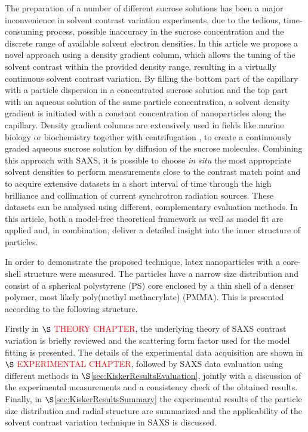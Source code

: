 The preparation of a number of different sucrose solutions has been a major inconvenience in solvent contrast variation experiments, due to the tedious, time-consuming process, possible inaccuracy in the sucrose concentration and the discrete range of available solvent electron densities. In this article we propose a novel approach using a density gradient column, which allows the tuning of the solvent contrast within the provided density range, resulting in a virtually continuous solvent contrast variation. By filling the bottom part of the capillary with a particle dispersion in a concentrated sucrose solution and the top part with an aqueous solution of the same particle concentration, a solvent density gradient is initiated with a constant concentration of nanoparticles along the capillary. Density gradient columns are extensively used in fields like marine biology \citet{coombs_density-gradient_1981} or biochemistry together with centrifugation \citet{hinton_density_1978}, to create a continuously graded aqueous sucrose solution by diffusion of the sucrose molecules. Combining this approach with SAXS, it is possible to choose \emph{in situ} the most appropriate solvent densities to perform measurements close to the contrast match point and to acquire extensive datasets in a short interval of time through the high brilliance and collimation of current synchrotron radiation sources. These datasets can be analysed using different, complementary evaluation methods. In this article, both a model-free theoretical framework as well as model fit are applied and, in combination, deliver a detailed insight into the inner structure of particles. 

In order to demonstrate the proposed technique, latex nanoparticles with a core-shell structure were measured. The particles have a narrow size distribution and consist of a spherical polystyrene (PS) core enclosed by a thin shell of a denser polymer, most likely poly(methyl methacrylate) (PMMA). This is presented according to the following structure. 

Firstly in \(\S\) \textcolor{red}{THEORY CHAPTER}, the underlying theory of SAXS contrast variation is briefly reviewed and the scattering form factor used for the model fitting is presented. The details of the experimental data acquisition are shown in \(\S\) \textcolor{red}{EXPERIMENTAL CHAPTER}, followed by SAXS data evaluation using different methods in \(\S\)\ref{sec:KiskerResultsEvaluation}, jointly with a discussion of the experimental measurements and a consistency check of the obtained results. Finally, in \(\S\)\ref{sec:KiskerResultsSummary} the experimental results of the particle size distribution and radial structure are summarized and the applicability of the solvent contrast variation technique in SAXS is discussed.

